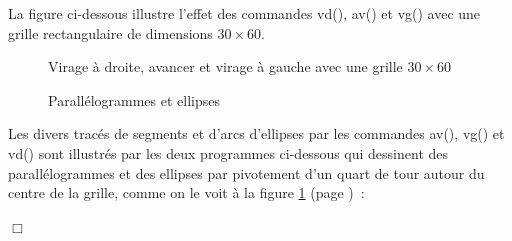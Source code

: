  La figure 
 ci-dessous
illustre l'effet des commandes
 {\idt vd()},  {\idt av()} et {\idt vg()} avec une grille rectangulaire de dimensions $30 \times 60$.
\begin{figure}[htbp]
 \caption{Virage  à droite, avancer et virage à gauche avec une grille $30 \times 60$}
\end{figure}
\begin{figure}[htbp]
 \caption{Parallélogrammes et ellipses}
 \label{fig:parel}
\end{figure}
\begin{exemple}{\rm 
\renewcommand{\carrenoir}{\hspace{-4mm}\rule{1.5mm}{1.5mm}\hspace{2.5mm}}
Les divers tracés de segments et d'arcs d'el\-lip\-ses par les commandes {\idt av()}, {\idt vg()} 
et {\idt vd()} sont illustrés par les deux programmes ci-dessous qui dessinent des parallélogrammes et
des ellipses par pivotement d'un quart de tour autour du centre de la grille, comme on le voit à la 
fi\-gu\-re \ref{fig:parel} (page \pageref{fig:parel})~:\hfill


\renewcommand{\carrenoir}{}
\noindent $\Box$}\end{exemple}

